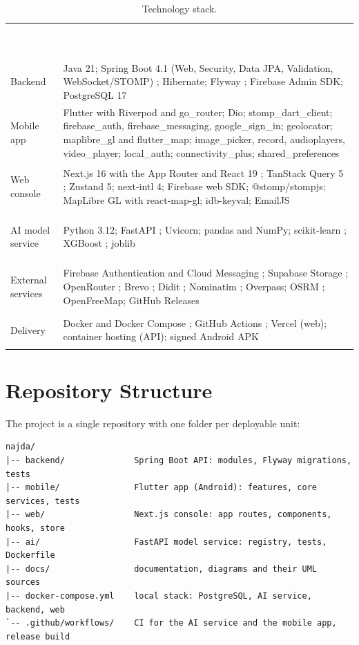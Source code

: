 \begin{table}[!htbp]
\caption{Technology stack.}\label{tab:stack}
\centering\tabfont\rowband
\begin{tabular}{@{}>{\bfseries\raggedright\arraybackslash}p{2.6cm}>{\raggedright\arraybackslash}p{12cm}@{}}
\rowcolor{najdanavy}\textcolor{white}{\sffamily\bfseries\small Layer} & \textcolor{white}{\sffamily\bfseries\small Technology} \\
Backend & Java 21; Spring Boot 4.1 (Web, Security, Data JPA, Validation, WebSocket/STOMP) \cite{springboot}; Hibernate; Flyway \cite{flyway}; Firebase Admin SDK; PostgreSQL 17 \cite{postgresql} \\
Mobile app & Flutter \cite{flutter} with Riverpod \cite{riverpod} and go\_router; Dio; stomp\_dart\_client; firebase\_auth, firebase\_messaging, google\_sign\_in; geolocator; maplibre\_gl and flutter\_map; image\_picker, record, audioplayers, video\_player; local\_auth; connectivity\_plus; shared\_preferences \\
Web console & Next.js 16 with the App Router and React 19 \cite{nextjs}; TanStack Query 5 \cite{tanstackquery}; Zustand 5; next-intl 4; Firebase web SDK; @stomp/stompjs; MapLibre GL with react-map-gl; idb-keyval; EmailJS \\
AI model service & Python 3.12; FastAPI \cite{fastapi}; Uvicorn; pandas and NumPy; scikit-learn \cite{pedregosa2011sklearn}; XGBoost \cite{chen2016xgboost}; joblib \\
External services & Firebase Authentication and Cloud Messaging \cite{firebase}; Supabase Storage \cite{supabase}; OpenRouter \cite{openrouter}; Brevo \cite{brevo}; Didit \cite{didit}; Nominatim \cite{nominatim}; Overpass; OSRM \cite{osrm}; OpenFreeMap; GitHub Releases \\
Delivery & Docker and Docker Compose \cite{docker}; GitHub Actions \cite{githubactions}; Vercel (web); container hosting (API); signed Android APK \\
\end{tabular}
\end{table}

\section{Repository Structure}

The project is a single repository with one folder per deployable unit:

\begin{lstlisting}[language={},numbers=none,caption={Repository layout.},label={lst:repo}]
najda/
|-- backend/              Spring Boot API: modules, Flyway migrations, tests
|-- mobile/               Flutter app (Android): features, core services, tests
|-- web/                  Next.js console: app routes, components, hooks, store
|-- ai/                   FastAPI model service: registry, tests, Dockerfile
|-- docs/                 documentation, diagrams and their UML sources
|-- docker-compose.yml    local stack: PostgreSQL, AI service, backend, web
`-- .github/workflows/    CI for the AI service and the mobile app, release build
\end{lstlisting}

